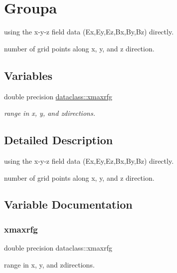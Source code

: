 \hypertarget{group__groupa}{}\section{Groupa}
\label{group__groupa}


using the x-\/y-\/z field data (Ex,Ey,Ez,Bx,By,Bz) directly.

number of grid points along x, y, and z direction.  


\subsection*{Variables}
\begin{DoxyCompactItemize}
\item 
double precision \mbox{\hyperlink{group__groupa_ga32b5b26da65d1b3507a36c17029a18ae}{dataclass\+::xmaxrfg}}
\begin{DoxyCompactList}\small\item\em range in x, y, and zdirections. \end{DoxyCompactList}\end{DoxyCompactItemize}


\subsection{Detailed Description}
using the x-\/y-\/z field data (Ex,Ey,Ez,Bx,By,Bz) directly.

number of grid points along x, y, and z direction. 



\subsection{Variable Documentation}
\mbox{\label{group__groupa_ga32b5b26da65d1b3507a36c17029a18ae}} 
\subsubsection{\texorpdfstring{xmaxrfg}{xmaxrfg}}
{\footnotesize\ttfamily double precision dataclass\+::xmaxrfg}



range in x, y, and zdirections. 

